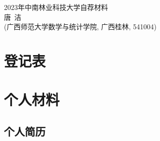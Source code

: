 \documentclass[UFT8]{ctexart}%
\begin{document}
\thispagestyle{empty} %
\vspace*{3cm}
\begin{center}
{{\LARGE\heiti 2023年中南林业科技大学自荐材料}\\[0.6cm]
{\normalsize 唐\ 洁}\\[0.1cm]
{\small(广西师范大学数学与统计学院, 广西桂林, 541004)}}
\end{center}

\clearpage%
\tableofcontents%
\thispagestyle{empty} %

\clearpage%
\setcounter{page}{1}%

\section{登记表}

%



\section{个人材料}

\subsection{个人简历}

\end{document}
